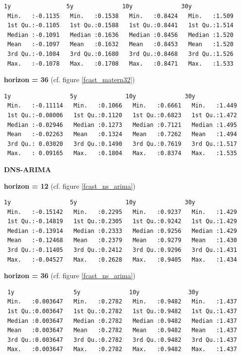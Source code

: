 \begin{verbatim}
1y                5y              10y              30y       
 Min.   :-0.1135   Min.   :0.1538   Min.   :0.8424   Min.   :1.509  
 1st Qu.:-0.1105   1st Qu.:0.1588   1st Qu.:0.8441   1st Qu.:1.514  
 Median :-0.1091   Median :0.1636   Median :0.8456   Median :1.520  
 Mean   :-0.1097   Mean   :0.1632   Mean   :0.8453   Mean   :1.520  
 3rd Qu.:-0.1084   3rd Qu.:0.1680   3rd Qu.:0.8468   3rd Qu.:1.526  
 Max.   :-0.1078   Max.   :0.1708   Max.   :0.8471   Max.   :1.533
\end{verbatim}

\textbf{horizon = 36} (cf. figure \ref{fcast_matern32})

\begin{verbatim}
1y                 5y              10y              30y       
 Min.   :-0.11114   Min.   :0.1066   Min.   :0.6661   Min.   :1.449  
 1st Qu.:-0.08006   1st Qu.:0.1120   1st Qu.:0.6823   1st Qu.:1.472  
 Median :-0.02946   Median :0.1273   Median :0.7121   Median :1.495  
 Mean   :-0.02263   Mean   :0.1324   Mean   :0.7262   Mean   :1.494  
 3rd Qu.: 0.03020   3rd Qu.:0.1490   3rd Qu.:0.7619   3rd Qu.:1.517  
 Max.   : 0.09165   Max.   :0.1804   Max.   :0.8374   Max.   :1.535 
\end{verbatim}

\textbf{DNS-ARIMA}

\textbf{horizon = 12} (cf. figure \ref{fcast_ns_arima})
\begin{verbatim}
1y                 5y              10y              30y       
 Min.   :-0.15142   Min.   :0.2295   Min.   :0.9237   Min.   :1.429  
 1st Qu.:-0.14819   1st Qu.:0.2305   1st Qu.:0.9242   1st Qu.:1.429  
 Median :-0.13914   Median :0.2333   Median :0.9256   Median :1.429  
 Mean   :-0.12468   Mean   :0.2379   Mean   :0.9279   Mean   :1.430  
 3rd Qu.:-0.11405   3rd Qu.:0.2412   3rd Qu.:0.9296   3rd Qu.:1.431  
 Max.   :-0.04527   Max.   :0.2628   Max.   :0.9405   Max.   :1.434 
\end{verbatim}

\textbf{horizon = 36} (cf. figure \ref{fcast_ns_arima})
\begin{verbatim}
 1y                 5y              10y              30y       
 Min.   :0.003647   Min.   :0.2782   Min.   :0.9482   Min.   :1.437  
 1st Qu.:0.003647   1st Qu.:0.2782   1st Qu.:0.9482   1st Qu.:1.437  
 Median :0.003647   Median :0.2782   Median :0.9482   Median :1.437  
 Mean   :0.003647   Mean   :0.2782   Mean   :0.9482   Mean   :1.437  
 3rd Qu.:0.003647   3rd Qu.:0.2782   3rd Qu.:0.9482   3rd Qu.:1.437  
 Max.   :0.003647   Max.   :0.2782   Max.   :0.9482   Max.   :1.437
\end{verbatim}
